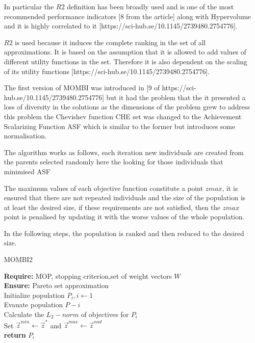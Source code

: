 In particular the $R2$ definition has been broadly used and is one of the most recommended performance indicators [8 from the article] along with Hypervolume and it is highly correlated to it [https://sci-hub.se/10.1145/2739480.2754776].

$R2$ is used because it induces the complete ranking in the set of all approximations. It is based on the assumption that it is allowed to add values of different utility functions in the set. Therefore it is also dependent on the scaling of its utility functions [https://sci-hub.se/10.1145/2739480.2754776].

The first version of MOMBI was introduced in [9 of https://sci-hub.se/10.1145/2739480.2754776] but it had the problem that the it presented a loss of diversity in the solutions as the dimensions of the problem grew to address this problem the Chevishev function CHE set was changed to  the Achievement Scalarizing Function ASF which is similar to the former but introduces some normalisation.

The algorithm works as follows, each iteration new individuals are created from the parents selected randomly  here the looking for those individuals that minimised ASF

The maximum values of each objective function constitute a point $zmax$, it is ensured that there are not repeated individuals and the size of the population is at least the desired size, if these requirements are not satisfied, then the $zmax$ point is penalised by updating it with the worse values of the whole population.

In the following steps, the population is ranked and then reduced to the desired size.

\begin{algorithm}[H]
\label{mombi2_alg}
\caption{MOMBI2}
\SetAlgoLined
\textbf{Require:} MOP, stopping criterion,set of weight vectors $W$\;\\
\textbf{Ensure:} Pareto set approximation\;\\
Initialize population $P_i,i \gets 1$\;\\
Evauate population $P-i$\;\\
Calculate the $L_2-norm$ of objectives for $P_i$\;\\
Set $\vec z^{min} \gets \vec z^*$ and $\vec z^{max} \gets \vec z^{nad}$\;\\
\textbf{return} $P_i$
\end{algorithm}

